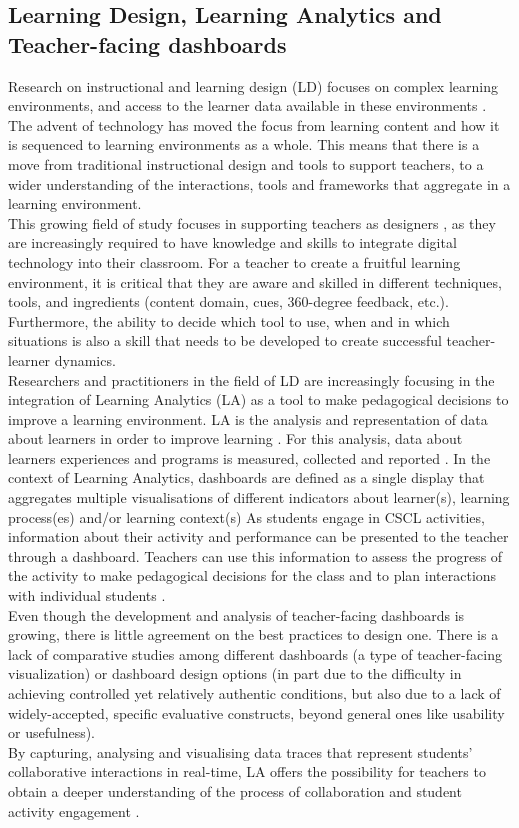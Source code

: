 \subsection{Learning Design, Learning Analytics and Teacher-facing dashboards}
Research on instructional and learning design (LD) focuses on complex learning environments, and access to the learner data available in these environments \cite{Wasson2020-lq}. The advent of technology has moved the focus from learning content and how it is sequenced to learning environments as a whole. This means that there is a move from traditional instructional design and tools to support teachers, to a wider understanding of the interactions, tools and frameworks that aggregate in a learning environment.\\
This growing field of study focuses in supporting teachers as designers \cite{Kirschner2015-yg}, as they are increasingly required to have knowledge and skills to integrate digital technology into their classroom. For a teacher to create a fruitful learning environment, it is critical that they are aware and skilled in different techniques, tools, and ingredients (content domain, cues, 360-degree feedback, etc.). Furthermore, the ability to decide which tool to use, when and in which situations is also a skill that needs to be developed to create successful teacher-learner dynamics.\\
Researchers and practitioners in the field of LD are increasingly focusing in the integration of Learning Analytics (LA) as a tool to make pedagogical decisions to improve a learning environment. LA is the analysis and representation of data about learners in order to improve learning \cite{Siemens2012-nf}. For this analysis, data about learners experiences and programs is measured, collected and reported \cite{Clow2013-ww}.
In the context of Learning Analytics, dashboards are defined as a single display that aggregates multiple visualisations of different indicators about learner(s), learning process(es) and/or learning context(s) \cite{Schwendimann2017-ci} As students engage in CSCL activities, information about their activity and performance can be presented to the teacher through a dashboard. Teachers can use this information to assess the progress of the activity to make pedagogical decisions for the class and to plan interactions with individual students \cite{Xhakaj_undated-xx}.\\
Even though the development and analysis of teacher-facing dashboards is growing, there is little agreement on the best practices to design one. \cite{Schwendimann2017-ci} There is a lack of comparative studies among different dashboards (a type of teacher-facing visualization) or dashboard design options (in part due to the difficulty in achieving controlled yet relatively authentic conditions, but also due to a lack of widely-accepted, specific evaluative constructs, beyond general ones like usability or usefulness). \\
By capturing, analysing and visualising data traces that represent students’ collaborative interactions in real-time, LA offers the possibility for teachers to obtain a deeper understanding of the process of collaboration and student activity engagement \cite{Jivet2018-nw}. 
